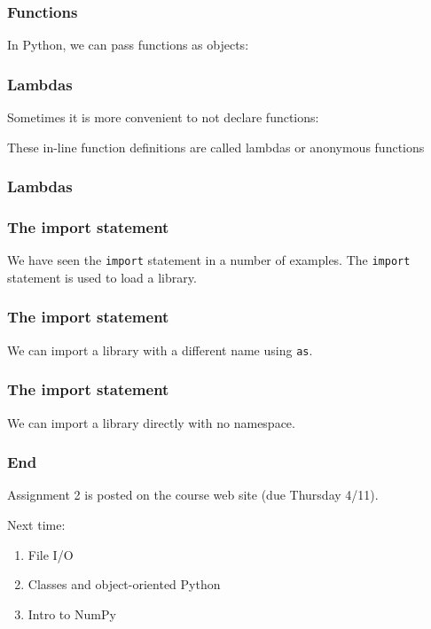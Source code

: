 \documentclass{beamer}
\begin{document}
\begin{frame}
\frametitle{Functions}
In Python, we can pass functions as objects:


\end{frame}

\begin{frame}
\frametitle{Lambdas}

Sometimes it is more convenient to not declare functions:


These in-line function definitions are called lambdas or anonymous functions
\end{frame}

\begin{frame}
\frametitle{Lambdas}


\end{frame}

\begin{frame}
\frametitle{The import statement}

We have seen the \texttt{import} statement in a number of examples.  The \texttt{import} statement is used to load a library.

\end{frame}

\begin{frame}
\frametitle{The import statement}

We can import a library with a different name using \texttt{as}.

\end{frame}

\begin{frame}
\frametitle{The import statement}

We can import a library directly with no namespace.

\end{frame}


\begin{frame}
\frametitle{End}
Assignment 2 is posted on the course web site (due Thursday 4/11).

\vspace{0.2in}

Next time:
\begin{enumerate}
\setlength{\itemsep}{0.05in}
\item{File I/O}
\item{Classes and object-oriented Python}
\item{Intro to NumPy}
\end{enumerate}

\end{frame}
\end{document}
